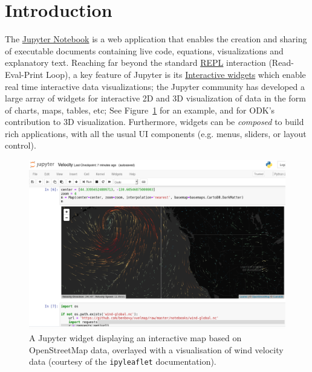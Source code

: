 \documentclass{deliverablereport}
\author{Odile Bénassy and Nicolas M. Thiéry}
\begin{document}
\maketitle
\githubissuedescription

\section{Introduction}


The \href{https://jupyter.org}{Jupyter Notebook} is a web application
that enables the creation and sharing of executable documents
containing live code, equations, visualizations and explanatory text.
Reaching far beyond the standard
\href{https://en.wikipedia.org/wiki/Read-eval-print_loop}{REPL}
interaction (Read-Eval-Print Loop), a key feature of Jupyter is its
\href{http://jupyter.org/widgets}{Interactive widgets} which enable
real time interactive data visualizations; the Jupyter community has
developed a large array of widgets for interactive 2D and 3D
visualization of data in the form of charts, maps, tables, etc;
See Figure~\ref{fig:ipyleaflet} for an example, and
 for ODK's contribution to 3D visualization.
Furthermore, widgets can be \emph{composed} to build rich
applications, with all the usual UI components (e.g. menus, sliders,
or layout control).

\begin{figure}[h]
  \begin{center}
    \includegraphics[width=\textwidth]{images/Velocity}
  \caption{A Jupyter widget displaying an interactive map based on
  OpenStreetMap data, overlayed with a visualisation of wind velocity
  data \tiny{(courtesy of the \lstinline{ipyleaflet} documentation)}.}
  \label{fig:ipyleaflet}
  \end{center}
\end{figure}
\end{document}
